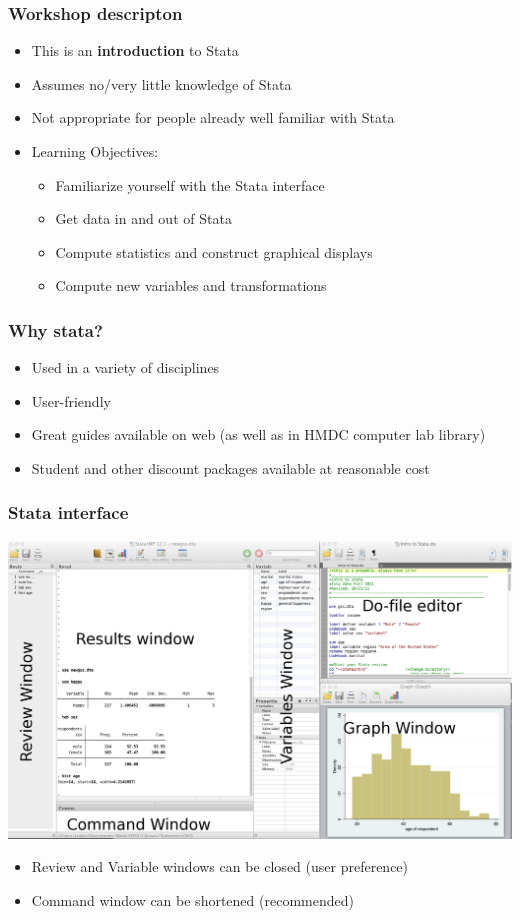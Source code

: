 \documentclass[table]{beamer}
\begin{document}
\begin{frame}
\frametitle{Workshop descripton}
\label{sec-1-3}

\begin{itemize}
\item This is an \textbf{introduction} to Stata
\item Assumes no/very little knowledge of Stata
\item Not appropriate for people already well familiar with Stata
\item Learning Objectives:
\begin{itemize}
\item Familiarize yourself with the Stata interface
\item Get data in and out of Stata
\item Compute statistics and construct graphical displays
\item Compute new variables and transformations
\end{itemize}
\end{itemize}
\end{frame}
\begin{frame}
\frametitle{Why stata?}
\label{sec-1-4}

\begin{itemize}
\item Used in a variety of disciplines
\item User-friendly
\item Great guides available on web (as well as in HMDC computer lab library)
\item Student and other discount packages available at reasonable cost
\end{itemize}
\end{frame}
\begin{frame}
\frametitle{Stata interface}
\label{sec-1-5}


\includegraphics[width=.9\linewidth]{images/StataInterface.png}
 
\begin{itemize}
\item Review and Variable windows can be closed (user preference)
\item Command window can be shortened (recommended)
\end{itemize}
\end{frame}
\end{document}
